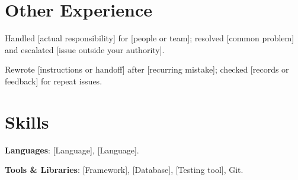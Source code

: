 \documentclass{resume}
\begin{document}
\section{Other Experience}

\begin{jobduties}
  \item Handled [actual responsibility] for [people or team]; resolved [common problem] and escalated [issue outside your authority].
  \item Rewrote [instructions or handoff] after [recurring mistake]; checked [records or feedback] for repeat issues.
\end{jobduties}

\section{Skills}
\begin{skillitems}
  \item \textbf{Languages}: [Language], [Language].
  \item \textbf{Tools \& Libraries}: [Framework], [Database], [Testing tool], Git.
\end{skillitems}
\end{document}
